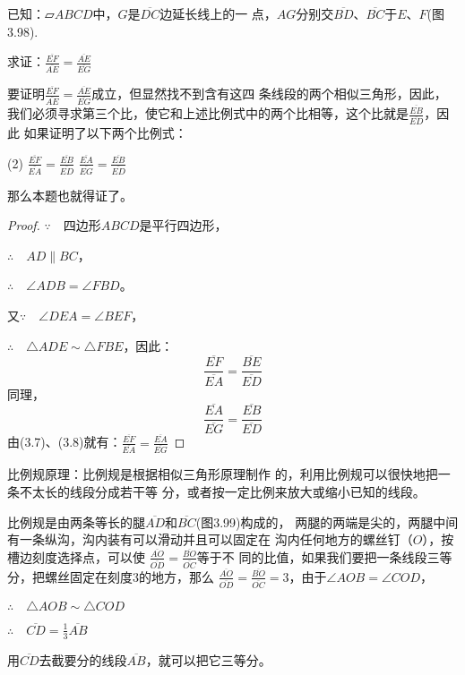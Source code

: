\begin{example}
    已知：$\parallelogram{ABCD}$中，$G$是$\overline{DC}$边延长线上的一
点，$AG$分别交$\overline{BD}$、$\overline{BC}$于$E$、$F$(图3.98).

求证：$\frac{\overline{EF}}{\overline{AE}}=\frac{\overline{AE}}{\overline{EG}}$
\end{example}

\begin{analyze}
    要证明$\frac{\overline{EF}}{\overline{AE}}=\frac{\overline{AE}}{\overline{EG}}$成立，但显然找不到含有这四
    条线段的两个相似三角形，因此，我们必须寻求第三个比，使它和上述比例式中的两个比相等，这个比就是$\frac{\overline{EB}}{\overline{ED}}$，因此
    如果证明了以下两个比例式：
\begin{tasks}(2)
    \task $\frac{\overline{EF}}{\overline{EA}}=\frac{\overline{EB}}{\overline{ED}}$
    \task $\frac{\overline{EA}}{\overline{EG}}=\frac{\overline{EB}}{\overline{ED}}$
\end{tasks}
那么本题也就得证了。
\end{analyze}

\begin{proof}
$\because\quad $四边形$ABCD$是平行四边形，

$\therefore\quad AD\parallel BC$，

$\therefore\quad \angle ADB=\angle FBD$。

又$\because\quad \angle DEA=\angle BEF$，

$\therefore\quad \triangle ADE\sim \triangle FBE$，因此：
\begin{equation}
    \frac{\overline{EF}}{\overline{EA}}=\frac{\overline{BE}}{\overline{ED}}
\end{equation}
同理，
\begin{equation}
    \frac{\overline{EA}}{\overline{EG}}=\frac{\overline{EB}}{\overline{ED}}
\end{equation}
由(3.7)、(3.8)就有：$\frac{\overline{EF}}{\overline{EA}}=\frac{\overline{EA}}{\overline{EG}}$
\end{proof}

\begin{example}
    比例规原理：比例规是根据相似三角形原理制作
的，利用比例规可以很快地把一条不太长的线段分成若干等
分，或者按一定比例来放大或缩小已知的线段。

比例规是由两条等长的腿$\overline{AD}$和$\overline{BC}$(图3.99)构成的，
两腿的两端是尖的，两腿中间有一条纵沟，沟内装有可以滑动并且可以固定在
沟内任何地方的螺丝钉（$O$），按槽边刻度选择点，可以使
$\frac{\overline{AO}}{\overline{OD}}=\frac{\overline{BO}}{\overline{OC}}$等于不
同的比值，如果我们要把一条线段三等
分，把螺丝固定在刻度3的地方，那么
$\frac{\overline{AO}}{\overline{OD}}=\frac{\overline{BO}}{\overline{OC}}=3$，由于$\angle AOB=\angle COD$，

$\therefore\quad \triangle AOB\sim \triangle COD$

$\therefore\quad \overline{CD}=\frac{1}{3}\overline{AB}$

用$\overline{CD}$去截要分的线段$\overline{AB}$，就可以把它三等分。
\end{example}

